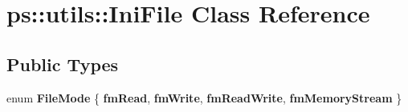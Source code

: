 \hypertarget{classps_1_1utils_1_1IniFile}{}\section{ps\+:\+:utils\+:\+:Ini\+File Class Reference}
\label{classps_1_1utils_1_1IniFile}
\subsection*{Public Types}
\begin{DoxyCompactItemize}
\item 
\hypertarget{classps_1_1utils_1_1IniFile_a80edfc4b159559e04445a5d9cedc2c1f}{}enum {\bfseries File\+Mode} \{ {\bfseries fm\+Read}, 
{\bfseries fm\+Write}, 
{\bfseries fm\+Read\+Write}, 
{\bfseries fm\+Memory\+Stream}
 \}\label{classps_1_1utils_1_1IniFile_a80edfc4b159559e04445a5d9cedc2c1f}

\end{DoxyCompactItemize}

